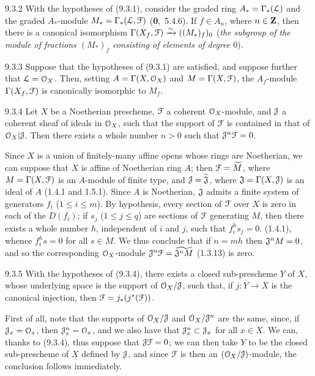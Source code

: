 \documentclass[../main.tex]{subfiles}
\begin{document}
\begin{cx}[Corollary]{9.3.2}
    With the hypotheses of {\normalfont(9.3.1)}, consider the graded ring $A_*=\Gamma_*(\mathcal{L})$ and the graded $A_*$-module $M_*=\Gamma_*(\mathcal{L},\mathcal{F})$ {\normalfont(\textbf{0},~5.4.6)}.
    If $f\in A_n$, where $n\in\mathbf{Z}$, then there is a canonical isomorphism $\Gamma(X_f,\mathcal{F})\xrightarrow{\sim}((M_*)_f)_0$ (\emph{the subgroup of the module of fractions $(M_*)_f$ consisting of elements of degree $0$}).
\end{cx}
\begin{cx}[Corollary]{9.3.3}
    Suppose that the hypotheses of {\normalfont(9.3.1)} are satisfied, and suppose further that $\mathcal{L}=\mathcal{O}_X$.
    Then, setting $A=\Gamma(X,\mathcal{O}_X)$ and $M=\Gamma(X,\mathcal{F})$, the $A_f$-module $\Gamma(X_f,\mathcal{F})$ is canonically isomorphic to $M_f$.
\end{cx}
\begin{cx}[Proposition]{9.3.4}
    Let $X$ be a Noetherian prescheme, $\mathcal{F}$ a coherent $\mathcal{O}_X$-module, and $\mathcal{J}$ a coherent sheaf of ideals in $\mathcal{O}_X$, such that the support of $\mathcal{F}$ is contained in that of $\mathcal{O}_X|\mathcal{J}$.
    Then there exists a whole number $n>0$ such that $\mathcal{J}^n\mathcal{F}=0$.
\end{cx}

Since $X$ is a union of finitely-many affine opens whose rings are Noetherian, we can suppose that $X$ is affine of Noetherian ring $A$; then $\mathcal{F}=\widetilde{M}$, where $M=\Gamma(X,\mathcal{F})$ is an $A$-module of finite type, and $\mathcal{J}=\widetilde{\mathfrak{J}}$, where $\mathfrak{J}=\Gamma(X,\mathcal{J})$ is an ideal of $A$ (1.4.1 and 1.5.1).
Since $A$ is Noetherian, $\mathfrak{J}$ admits a finite system of generators $f_i$ ($1\leqslant i\leqslant m$).
By hypothesis, every section of $\mathcal{F}$ over $X$ is zero in each of the $D(f_i)$; if $s_j$ ($1\leqslant j\leqslant q$) are sections of $\mathcal{F}$ generating $M$, then there exists a whole number $h$, independent of $i$ and $j$, such that $f_i^h s_j=0$. (1.4.1), whence $f_i^h s=0$ for all $s\in M$.
We thus conclude that if $n=mh$ then $\mathfrak{J}^n M=0$, and so the corresponding $\mathcal{O}_X$-module $\mathcal{J}^n\mathcal{F}=\widetilde{\mathfrak{J}^nM}$ (1.3.13) is zero.

\begin{cx}[Corollary]{9.3.5}
    With the hypotheses of {\normalfont(9.3.4)}, there exists a closed sub-prescheme $Y$ of $X$, whose underlying space is the support of $\mathcal{O}_X/\mathcal{J}$, such that, if $j\colon Y\to X$ is the canonical injection, then $\mathcal{F}=j_*(j^*(\mathcal{F}))$.
\end{cx}

First of all, note that the supports of $\mathcal{O}_X/\mathcal{J}$ and $\mathcal{O}_X/\mathcal{J}^n$ are the same, since, if $\mathcal{J}_x=\mathcal{O}_x$, then $\mathcal{J}_x^n=\mathcal{O}_x$, and we also have that $\mathcal{J}_x^n\subset\mathcal{J}_x$ for all $x\in X$.
We can, thanks to (9.3.4), thus suppose that $\mathcal{J}\mathcal{F}=0$; we can then take $Y$ to be the closed sub-prescheme of $X$ defined by $\mathcal{J}$, and since $\mathcal{F}$ is then an $(\mathcal{O}_X/\mathcal{J})$-module, the conclusion follows immediately.
\end{document}
